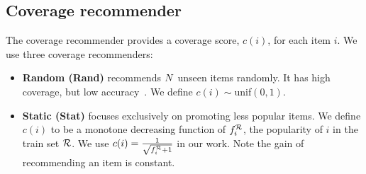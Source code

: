 \subsection{Coverage recommender}
The coverage recommender provides  a coverage score, $c(i)$, for each  item $i$. We use  three coverage recommenders: 
\begin{itemize}


\item \textbf{Random (Rand)}  recommends  $N$ unseen items randomly. It has high coverage, but  low accuracy~\cite{vargas2014improving}. We define $c(i) \sim $unif$(0,1)$. %


\iffalse
\subsubsection{Binary Complement  SVD} Here, we represent the user-item rating matrix using binary values, where 1 indicates the user rated the item and 0 indicates the item has not received any rating. We then apply SVD on the matrix. The resulting $\mathbf{\hat{R}}$ is estimated as in PureSVD. However to derive a model that  promote long-tail items,  we  need to flip the result $\hat{r}^{'} = 1 - \hat{r}$.
\fi

\item \textbf{Static (Stat)} focuses exclusively on promoting less popular items. We define $c(i)$ to be a monotone decreasing function of $f_i^{ \mathcal{R}}$,  the popularity  of $i$ in the train set $\mathcal{R}$. We use $c(i) =  \frac{1}{ \sqrt{f_i^{\mathcal{R}}+1 }}$ in our work.  %
Note the gain of recommending an item is constant. 




\end{itemize}
